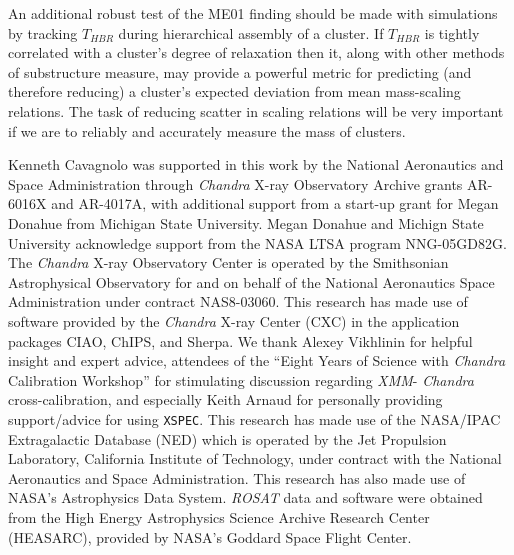 \documentclass{emulateapj}
\begin{document}
An additional robust test of the ME01 finding should be made with
simulations by tracking $T_{HBR}$ during hierarchical assembly of a
cluster. If $T_{HBR}$ is tightly correlated with a cluster's degree of
relaxation then it, along with other methods of substructure measure,
may provide a powerful metric for predicting (and therefore reducing)
a cluster's expected deviation from mean mass-scaling relations. The
task of reducing scatter in scaling relations will be very important
if we are to reliably and accurately measure the mass of clusters.


\acknowledgements
Kenneth Cavagnolo was supported in this work by the National
Aeronautics and Space Administration through {\it Chandra} X-ray
Observatory Archive grants AR-6016X and AR-4017A, with additional
support from a start-up grant for Megan Donahue from Michigan State
University. Megan Donahue and Michign State University acknowledge
support from the NASA LTSA program NNG-05GD82G. The {\it Chandra}
X-ray Observatory Center is operated by the Smithsonian Astrophysical
Observatory for and on behalf of the National Aeronautics Space
Administration under contract NAS8-03060. This research has made use
of software provided by the {\it Chandra} X-ray Center (CXC) in the
application packages CIAO, ChIPS, and Sherpa. We thank Alexey
Vikhlinin for helpful insight and expert advice, attendees of the
``Eight Years of Science with {\it Chandra} Calibration
Workshop'' for stimulating discussion regarding {\it XMM}-{\it
Chandra} cross-calibration, and especially Keith Arnaud for personally
providing support/advice for using {\tt XSPEC}. This research has made use
of the NASA/IPAC Extragalactic Database (NED) which is operated by the
Jet Propulsion Laboratory, California Institute of Technology, under
contract with the National Aeronautics and Space Administration. This
research has also made use of NASA's Astrophysics Data System. {\it
ROSAT} data and software were obtained from the High Energy
Astrophysics Science Archive Research Center (HEASARC), provided by
NASA's Goddard Space Flight Center.







\end{document}
